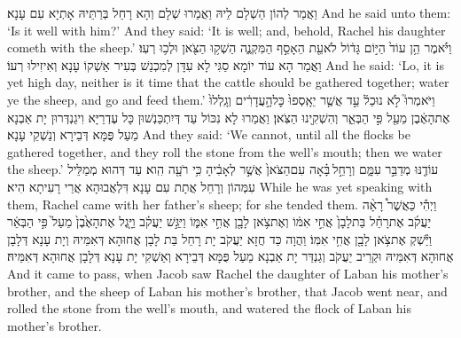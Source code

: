 {וַאֲמַר לְהוֹן הַשְׁלָם לֵיהּ וַאֲמַרוּ שְׁלָם וְהָא רָחֵל בְּרַתֵּיהּ אָתְיָא עִם עָנָא׃}
{And he said unto them: ‘Is it well with him?’ And they said: ‘It is well; and, behold, Rachel his daughter cometh with the sheep.’}{}
{וַיֹּ֗אמֶר הֵ֥ן עוֹד֙ הַיּ֣וֹם גָּד֔וֹל לֹא\maqqaf עֵ֖ת הֵאָסֵ֣ף הַמִּקְנֶ֑ה הַשְׁק֥וּ הַצֹּ֖אן וּלְכ֥וּ רְעֽוּ׃}
{וַאֲמַר הָא עוֹד יוֹמָא סַגִּי לָא עִדָּן לְמִכְנַשׁ בְּעִיר אַשְׁקוֹ עָנָא וְאִיזִילוּ רְעוֹ׃}
{And he said: ‘Lo, it is yet high day, neither is it time that the cattle should be gathered together; water ye the sheep, and go and feed them.’}{}
{וַיֹּאמְרוּ֮ לֹ֣א נוּכַל֒ עַ֣ד אֲשֶׁ֤ר יֵאָֽסְפוּ֙ כׇּל\maqqaf הָ֣עֲדָרִ֔ים וְגָֽלְלוּ֙ אֶת\maqqaf הָאֶ֔בֶן מֵעַ֖ל פִּ֣י הַבְּאֵ֑ר וְהִשְׁקִ֖ינוּ הַצֹּֽאן׃}
{וַאֲמַרוּ לָא נִכּוֹל עַד דְּיִתְכַּנְשׁוּן כָּל עֶדְרַיָּא וִיגַנְדְּרוּן יָת אַבְנָא מֵעַל פֻּמָּא דְּבֵירָא וְנַשְׁקֵי עָנָא׃}
{And they said: ‘We cannot, until all the flocks be gathered together, and they roll the stone from the well’s mouth; then we water the sheep.’}{}
{עוֹדֶ֖נּוּ מְדַבֵּ֣ר עִמָּ֑ם וְרָחֵ֣ל \legarmeh  בָּ֗אָה עִם\maqqaf הַצֹּאן֙ אֲשֶׁ֣ר לְאָבִ֔יהָ כִּ֥י רֹעָ֖ה הִֽוא׃}
{עַד דְּהוּא מְמַלֵּיל עִמְּהוֹן וְרָחֵל אֲתָת עִם עָנָא דִּלְאֲבוּהָא אֲרֵי רָעִיתָא הִיא׃}
{While he was yet speaking with them, Rachel came with her father’s sheep; for she tended them.}{}
{וַיְהִ֡י כַּאֲשֶׁר֩ רָאָ֨ה יַעֲקֹ֜ב אֶת\maqqaf רָחֵ֗ל בַּת\maqqaf לָבָן֙ אֲחִ֣י אִמּ֔וֹ וְאֶת\maqqaf צֹ֥אן לָבָ֖ן אֲחִ֣י אִמּ֑וֹ וַיִּגַּ֣שׁ יַעֲקֹ֗ב וַיָּ֤גֶל אֶת\maqqaf הָאֶ֙בֶן֙ מֵעַל֙ פִּ֣י הַבְּאֵ֔ר וַיַּ֕שְׁקְ אֶת\maqqaf צֹ֥אן לָבָ֖ן אֲחִ֥י אִמּֽוֹ׃}
{וַהֲוָה כַּד חֲזָא יַעֲקֹב יָת רָחֵל בַּת לָבָן אֲחוּהָא דְּאִמֵּיהּ וְיָת עָנָא דְּלָבָן אֲחוּהָא דְּאִמֵּיהּ וּקְרֵיב יַעֲקֹב וְגַנְדַּר יָת אַבְנָא מֵעַל פֻּמָּא דְּבֵירָא וְאַשְׁקִי יָת עָנָא דְּלָבָן אֲחוּהָא דְּאִמֵּיהּ׃}
{And it came to pass, when Jacob saw Rachel the daughter of Laban his mother’s brother, and the sheep of Laban his mother’s brother, that Jacob went near, and rolled the stone from the well’s mouth, and watered the flock of Laban his mother’s brother.}{}
